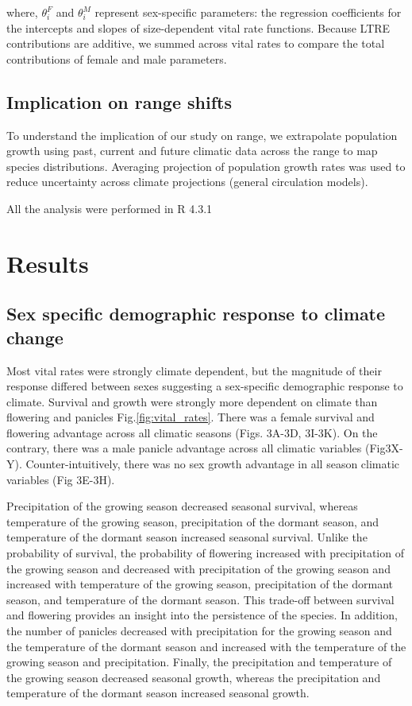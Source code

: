 \documentclass[11pt]{article}\usepackage[]{graphicx}\usepackage[usenames,dvipsnames]{xcolor}
\begin{document}
\noindent where, $\theta^{F}_{i}$ and $\theta^{M}_{i}$ represent sex-specific parameters: the regression coefficients for the intercepts and slopes of size-dependent vital rate functions. 
Because LTRE contributions are additive, we summed across vital rates to compare the total contributions of female and male parameters. 

\subsection*{Implication on range shifts}
To understand the implication of our study on range, we extrapolate population growth using past, current and future climatic data  across the range to map species distributions. 
Averaging projection of population growth rates was used to reduce uncertainty across climate projections (general circulation models). 

All the analysis were performed in R 4.3.1 \citep{RCoreteam}

\section*{Results}
\subsection*{Sex specific demographic response to climate change}
Most vital rates were strongly climate dependent, but the magnitude of their response differed between sexes suggesting a sex-specific demographic response to climate. 
Survival and growth were strongly more dependent on climate than flowering and panicles Fig.\ref{fig:vital_rates}.
There was a female survival and flowering advantage across all climatic seasons (Figs. 3A-3D, 3I-3K). 
On the contrary, there was a male panicle advantage across all climatic variables (Fig3X-Y). 
Counter-intuitively, there was no sex growth advantage in all season climatic variables (Fig 3E-3H). 

Precipitation of the growing season decreased seasonal survival, whereas temperature of the growing season, precipitation of the dormant season, and temperature of the dormant season increased seasonal survival.
Unlike the probability of survival, the probability of flowering increased with precipitation of the growing season and decreased with precipitation of the growing season and increased with temperature of the growing season, precipitation of the dormant season, and temperature of the dormant season.
This trade-off between survival and flowering provides an insight into the persistence of the species. 
In addition, the number of panicles decreased with precipitation for the growing season and the temperature of the dormant season and increased with the temperature of the growing season and precipitation.
Finally, the precipitation and temperature of the growing season decreased seasonal growth, whereas the precipitation and temperature of the dormant season increased seasonal growth. 
\end{document}
